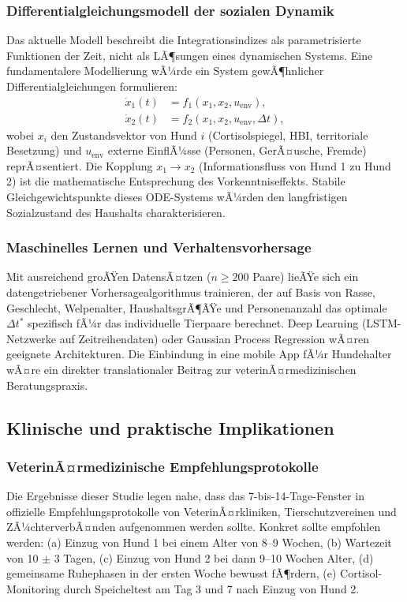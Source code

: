 ﻿\documentclass[12pt, a4paper]{article}
\theoremstyle{plain}
\theoremstyle{definition}
\theoremstyle{remark}
\newcommand{\dt}{\Delta t}
\begin{document}
\subsubsection{Differentialgleichungsmodell der sozialen Dynamik}

Das aktuelle Modell beschreibt die Integrationsindizes als parametrisierte
Funktionen der Zeit, nicht als LÃ¶sungen eines dynamischen Systems. Eine
fundamentalere Modellierung wÃ¼rde ein System gewÃ¶hnlicher
Differentialgleichungen formulieren:
\begin{align}
  \dot{x}_1(t) &= f_1(x_1, x_2, u_{\text{env}}),\\
  \dot{x}_2(t) &= f_2(x_1, x_2, u_{\text{env}}, \dt),
\end{align}
wobei $x_i$ den Zustandsvektor von Hund $i$ (Cortisolspiegel, HBI, territoriale
Besetzung) und $u_{\text{env}}$ externe EinflÃ¼sse (Personen, GerÃ¤usche, Fremde)
reprÃ¤sentiert. Die Kopplung $x_1 \to x_2$ (Informationsfluss von Hund 1 zu
Hund 2) ist die mathematische Entsprechung des Vorkenntniseffekts. Stabile
Gleichgewichtspunkte dieses ODE-Systems wÃ¼rden den langfristigen
Sozialzustand des Haushalts charakterisieren.

\subsubsection{Maschinelles Lernen und Verhaltensvorhersage}

Mit ausreichend groÃŸen DatensÃ¤tzen ($n \geq 200$ Paare) lieÃŸe sich ein
datengetriebener Vorhersagealgorithmus trainieren, der auf Basis von
Rasse, Geschlecht, Welpenalter, HaushaltsgrÃ¶ÃŸe und Personenanzahl das
optimale $\dt^*$ spezifisch fÃ¼r das individuelle Tierpaare berechnet. Deep
Learning (LSTM-Netzwerke auf Zeitreihendaten) oder Gaussian Process Regression
wÃ¤ren geeignete Architekturen. Die Einbindung in eine mobile App fÃ¼r
Hundehalter wÃ¤re ein direkter translationaler Beitrag zur veterinÃ¤rmedizinischen
Beratungspraxis.

\subsection{Klinische und praktische Implikationen}

\subsubsection{VeterinÃ¤rmedizinische Empfehlungsprotokolle}

Die Ergebnisse dieser Studie legen nahe, dass das 7-bis-14-Tage-Fenster
in offizielle Empfehlungsprotokolle von VeterinÃ¤rkliniken, Tierschutzvereinen
und ZÃ¼chterverbÃ¤nden aufgenommen werden sollte. Konkret sollte empfohlen
werden: (a) Einzug von Hund 1 bei einem Alter von 8--9 Wochen, (b) Wartezeit
von 10 $\pm$ 3 Tagen, (c) Einzug von Hund 2 bei dann 9--10 Wochen Alter,
(d) gemeinsame Ruhephasen in der ersten Woche bewusst fÃ¶rdern, (e) Cortisol-
Monitoring durch Speicheltest am Tag 3 und 7 nach Einzug von Hund 2.
\end{document}
